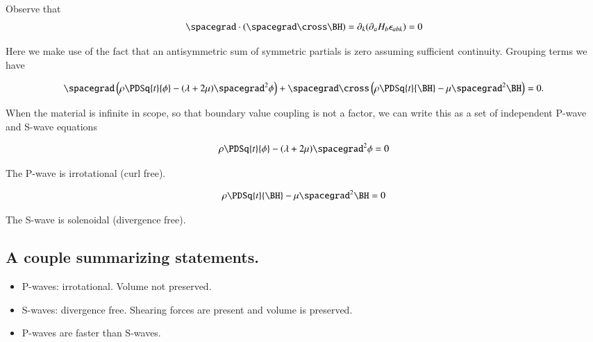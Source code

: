 Observe that
\begin{align*}
\spacegrad \cdot (\spacegrad \cross \BH) 
=
\partial_k (\partial_a H_b \epsilon_{abk}) =
0
\end{align*}

Here we make use of the fact that an antisymmetric sum of symmetric partials is zero assuming sufficient continuity.  Grouping terms we have

\begin{equation}\label{eqn:continuumL7:450}
\spacegrad 
\left(
\rho \PDSq{t}{\phi} - (\lambda + 2\mu) \spacegrad^2 \phi
\right)
+ 
\spacegrad \cross 
\left(
\rho \PDSq{t}{\BH} - \mu \spacegrad^2 \BH
\right)
= 0.
\end{equation}

When the material is infinite in scope, so that boundary value coupling is not a factor, we can write this as a set of independent P-wave and S-wave equations

\begin{equation}\label{eqn:continuumL7:470}
\rho \PDSq{t}{\phi} - (\lambda + 2\mu) \spacegrad^2 \phi = 0
\end{equation}

The P-wave is irrotational (curl free).

\begin{equation}\label{eqn:continuumL7:490}
\rho \PDSq{t}{\BH} - \mu \spacegrad^2 \BH = 0
\end{equation}

The S-wave is solenoidal (divergence free).

\subsection{A couple summarizing statements.}

\begin{itemize}
\item 
P-waves: irrotational.  Volume not preserved.
\item 
S-waves: divergence free.  Shearing forces are present and volume is preserved.
\item 
P-waves are faster than S-waves.
\end{itemize}

\EndArticle
